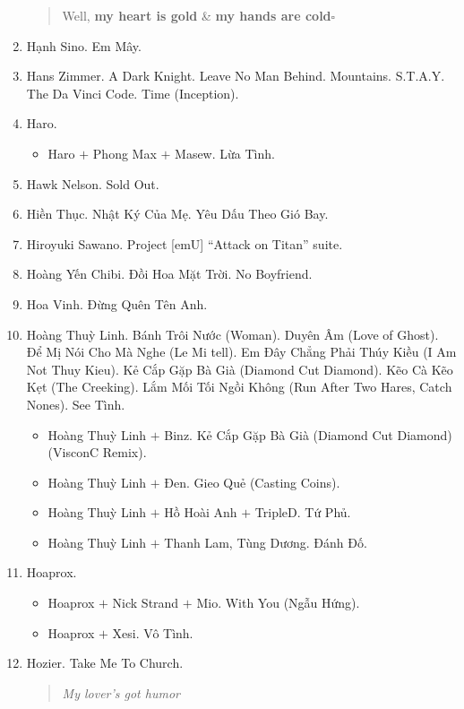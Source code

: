 \documentclass{article}
\begin{document}
\begin{enumerate}
\begin{quotation}
		Well, \textbf{my heart is gold} \& \textbf{my hands are cold}\hfill$\square$
	\end{quotation}
	\item {\sc Hạnh Sino.} Em Mây.
	\item {\sc Hans Zimmer.} A Dark Knight. Leave No Man Behind. Mountains. S.T.A.Y. The Da Vinci Code. Time (Inception).
	\item {\sc Haro.}
	\begin{itemize}
		\item {\sc Haro $+$ Phong Max $+$ Masew.} Lừa Tình.
	\end{itemize}
	\item {\sc Hawk Nelson.} Sold Out.
	\item {\sc Hiền Thục.} Nhật Ký Của Mẹ. Yêu Dấu Theo Gió Bay.
	\item {\sc Hiroyuki Sawano.} Project [emU] ``Attack on Titan'' suite.
	\item {\sc Hoàng Yến Chibi.} Đồi Hoa Mặt Trời. No Boyfriend.
	\item {\sc Hoa Vinh.} Đừng Quên Tên Anh.
	\item {\sc Hoàng Thuỳ Linh.} Bánh Trôi Nước (Woman). Duyên Âm (Love of Ghost). Để Mị Nói Cho Mà Nghe (Le Mi tell). Em Đây Chẳng Phải Thúy Kiều (I Am Not Thuy Kieu). Kẻ Cắp Gặp Bà Già (Diamond Cut Diamond). Kẽo Cà Kẽo Kẹt (The Creeking). Lắm Mối Tối Ngồi Không (Run After Two Hares, Catch Nones). See Tình.
	\begin{itemize}
		\item {\sc Hoàng Thuỳ Linh $+$ Binz.} Kẻ Cắp Gặp Bà Già (Diamond Cut Diamond) (VisconC Remix). 
		\item {\sc Hoàng Thuỳ Linh $+$ Đen.} Gieo Quẻ (Casting Coins).
		\item {\sc Hoàng Thuỳ Linh $+$ Hồ Hoài Anh $+$ TripleD.} Tứ Phủ.
		\item {\sc Hoàng Thuỳ Linh $+$ Thanh Lam, Tùng Dương.} Đánh Đố.
	\end{itemize}
	\item {\sc Hoaprox.}
	\begin{itemize}
		\item {\sc Hoaprox $+$ Nick Strand $+$ Mio.} With You (Ngẫu Hứng).
		\item {\sc Hoaprox $+$ Xesi.} Vô Tình.
	\end{itemize}
	\item {\sc Hozier.} Take Me To Church.
	
	\begin{quotation}\it
		My lover's got humor
		

\end{quotation}
\end{enumerate}
\end{document}
